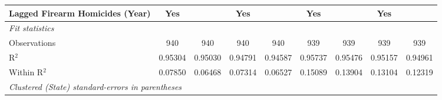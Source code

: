 \begin{tabular}{lcccccccc}
   Lagged Firearm Homicides (Year)     & Yes              &                  & Yes              &                  & Yes              &                  & Yes              & \\  
   \midrule
   \emph{Fit statistics}\\
   Observations                        & 940              & 940              & 940              & 940              & 939              & 939              & 939              & 939\\  
   R$^2$                               & 0.95304          & 0.95030          & 0.94791          & 0.94587          & 0.95737          & 0.95476          & 0.95157          & 0.94961\\  
   Within R$^2$                        & 0.07850          & 0.06468          & 0.07314          & 0.06527          & 0.15089          & 0.13904          & 0.13104          & 0.12319\\  
   \midrule \midrule
   \multicolumn{9}{l}{\emph{Clustered (State) standard-errors in parentheses}}\\
\end{tabular}
\par\endgroup


